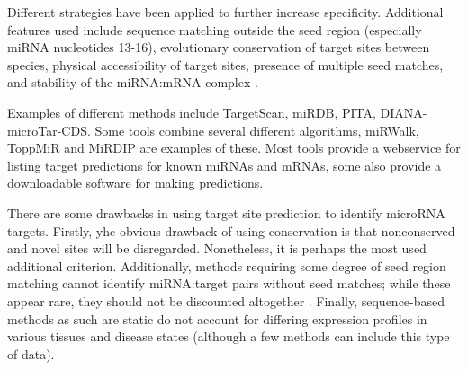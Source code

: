 Different strategies have been applied to further increase specificity.
Additional features used include sequence matching outside the seed region
(especially miRNA nucleotides 13-16), evolutionary conservation of target
sites between species, physical accessibility of target sites, presence of
multiple seed matches, and stability of the miRNA:mRNA complex
\citep{Akhtar2016}.

Examples of different methods include TargetScan,
miRDB, PITA, DIANA-microTar-CDS. Some tools combine several different algorithms,
miRWalk, ToppMiR and MiRDIP are examples of these. Most tools provide
a webservice for listing target predictions for known miRNAs and mRNAs,
some also provide a downloadable software for making predictions.

There are some drawbacks in using target site prediction to identify microRNA
targets. Firstly, yhe obvious drawback of using conservation is that nonconserved and
novel sites will be disregarded. Nonetheless, it is perhaps the most used
additional criterion. Additionally, methods requiring some degree of seed region matching
cannot identify miRNA:target pairs without seed matches; while these appear
rare, they should not be discounted altogether \citep{Bartel2009}.
Finally, sequence-based methods as such are static do not account for
differing expression profiles in various tissues and disease states (although a
few methods can include this type of data).






